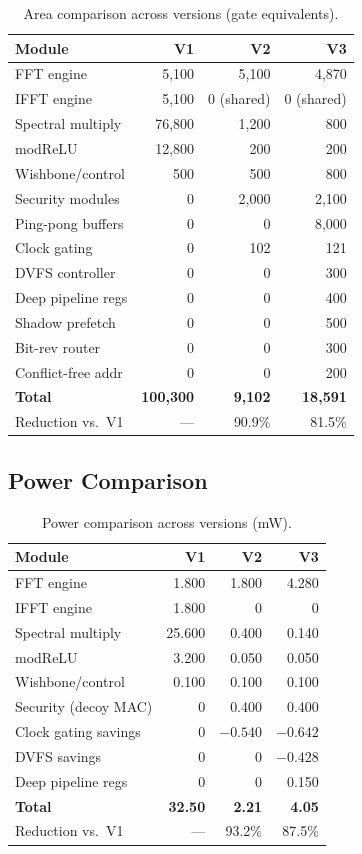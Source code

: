 \documentclass[11pt,a4paper]{article}
\theoremstyle{definition}
\theoremstyle{remark}
\begin{document}
\begin{table}[h]
\centering
\caption{Area comparison across versions (gate equivalents).}
\label{tab:area}
\begin{tabular}{lrrr}
\toprule
\textbf{Module} & \textbf{V1} & \textbf{V2} & \textbf{V3} \\
\midrule
FFT engine & 5{,}100 & 5{,}100 & 4{,}870 \\
IFFT engine & 5{,}100 & 0 (shared) & 0 (shared) \\
Spectral multiply & 76{,}800 & 1{,}200 & 800 \\
modReLU & 12{,}800 & 200 & 200 \\
Wishbone/control & 500 & 500 & 800 \\
Security modules & 0 & 2{,}000 & 2{,}100 \\
Ping-pong buffers & 0 & 0 & 8{,}000 \\
Clock gating & 0 & 102 & 121 \\
DVFS controller & 0 & 0 & 300 \\
Deep pipeline regs & 0 & 0 & 400 \\
Shadow prefetch & 0 & 0 & 500 \\
Bit-rev router & 0 & 0 & 300 \\
Conflict-free addr & 0 & 0 & 200 \\
\midrule
\textbf{Total} & \textbf{100{,}300} & \textbf{9{,}102} & \textbf{18{,}591} \\
Reduction vs.\ V1 & --- & 90.9\% & 81.5\% \\
\bottomrule
\end{tabular}
\end{table}

\subsection{Power Comparison}

\begin{table}[h]
\centering
\caption{Power comparison across versions (mW).}
\label{tab:power}
\begin{tabular}{lrrr}
\toprule
\textbf{Module} & \textbf{V1} & \textbf{V2} & \textbf{V3} \\
\midrule
FFT engine & 1.800 & 1.800 & 4.280 \\
IFFT engine & 1.800 & 0 & 0 \\
Spectral multiply & 25.600 & 0.400 & 0.140 \\
modReLU & 3.200 & 0.050 & 0.050 \\
Wishbone/control & 0.100 & 0.100 & 0.100 \\
Security (decoy MAC) & 0 & 0.400 & 0.400 \\
Clock gating savings & 0 & $-0.540$ & $-0.642$ \\
DVFS savings & 0 & 0 & $-0.428$ \\
Deep pipeline regs & 0 & 0 & 0.150 \\
\midrule
\textbf{Total} & \textbf{32.50} & \textbf{2.21} & \textbf{4.05} \\
Reduction vs.\ V1 & --- & 93.2\% & 87.5\% \\
\bottomrule
\end{tabular}
\end{table}
\end{document}
